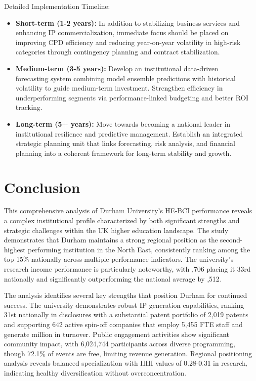 \documentclass[journal,onecolumn, 10pt,draftclsnofoot]{IEEEtran}
\begin{document}
Detailed Implementation Timeline:

\begin{itemize}
    \item \textbf{Short-term (1-2 years):} In addition to stabilizing business services and enhancing IP commercialization, immediate focus should be placed on improving CPD efficiency and reducing year-on-year volatility in high-risk categories through contingency planning and contract stabilization.
    
    \item \textbf{Medium-term (3-5 years):} Develop an institutional data-driven forecasting system combining model ensemble predictions with historical volatility to guide medium-term investment. Strengthen efficiency in underperforming segments via performance-linked budgeting and better ROI tracking.
    
    \item \textbf{Long-term (5+ years):} Move towards becoming a national leader in institutional resilience and predictive management. Establish an integrated strategic planning unit that links forecasting, risk analysis, and financial planning into a coherent framework for long-term stability and growth.
\end{itemize}

\section{Conclusion}

This comprehensive analysis of Durham University's HE-BCI performance reveals a complex institutional profile characterized by both significant strengths and strategic challenges within the UK higher education landscape. The study demonstrates that Durham maintains a strong regional position as the second-highest performing institution in the North East, consistently ranking among the top 15\% nationally across multiple performance indicators. The university's research income performance is particularly noteworthy, with ,706 placing it 33rd nationally and significantly outperforming the national average by ,512.

The analysis identifies several key strengths that position Durham for continued success. The university demonstrates robust IP generation capabilities, ranking 31st nationally in disclosures with a substantial patent portfolio of 2,019 patents and supporting 642 active spin-off companies that employ 5,455 FTE staff and generate  million in turnover. Public engagement activities show significant community impact, with 6,024,744 participants across diverse programming, though 72.1\% of events are free, limiting revenue generation. Regional positioning analysis reveals balanced specialization with HHI values of 0.28-0.31 in research, indicating healthy diversification without overconcentration.
\end{document}
